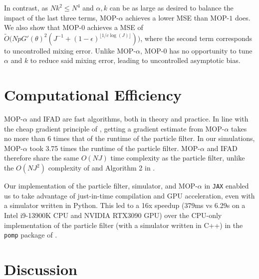\documentclass[9pt,twocolumn,pnasresearcharticle]{pnas-new}
\begin{document}
In contrast, as $Nk^2 \leq N^4$ and $\alpha, k$ can be as large as desired to balance the impact of the last three terms, MOP-$\alpha$ achieves a lower MSE than MOP-$1$ does. We also show that MOP-$0$ achieves a MSE of $\tilde{O}\big(NpG'(\theta)^2(J^{-1}+(1-\epsilon)^{\lfloor1/c\log(J)\rfloor})\big)$, where the second term corresponds to uncontrolled mixing error. Unlike MOP-$\alpha$, MOP-$0$ has no opportunity to tune $\alpha$ and $k$ to reduce said mixing error, leading to uncontrolled asymptotic bias. 



\section{Computational Efficiency}

MOP-$\alpha$ and IFAD are fast algorithms, both in theory and practice. 
In line with the cheap gradient principle of \cite{kakade2019provably}, getting a gradient estimate from MOP-$\alpha$ takes no more than 6 times that of the runtime of the particle filter. In our simulations, MOP-$\alpha$ took 3.75 times the runtime of the particle filter. 
MOP-$\alpha$ and IFAD therefore share the same $O(NJ)$ time complexity as the particle filter, unlike the $O(NJ^2)$ complexity of \cite{corenflos21} and Algorithm 2 in \cite{poyiadjis11, scibior21}.



Our implementation of the particle filter, simulator, and MOP-$\alpha$ in \texttt{JAX} \cite{jax} enabled us to take advantage of just-in-time compilation and GPU acceleration, even with a simulator written in Python. This led to a 16x speedup (379ms vs 6.29s on a Intel i9-13900K CPU and NVIDIA RTX3090 GPU) over the CPU-only implementation of the particle filter (with a simulator written in C++) in the \texttt{pomp} package of \cite{king16}. 






\section{Discussion}
\end{document}
